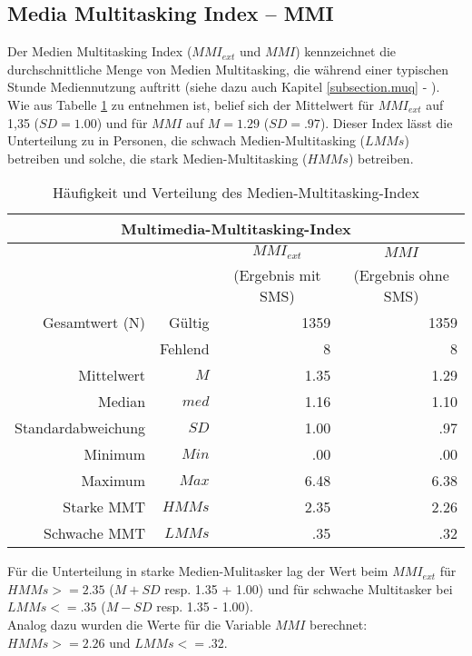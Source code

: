 \subsection{Media Multitasking Index -- MMI}
Der Medien Multitasking Index ($MMI_{ext}$ und $MMI$) kennzeichnet die durchschnittliche Menge von Medien Multitasking, die während einer typischen Stunde Mediennutzung auftritt (siehe dazu auch Kapitel \ref{subsection.muq} - ). Wie aus Tabelle \ref{table.deskrptMedien} zu entnehmen ist, belief sich der Mittelwert für $MMI_{ext}$ auf 1,35 ($SD =  1.00$) und für $MMI$ auf $M = 1.29$ ($SD = .97$). Dieser Index lässt die Unterteilung zu in Personen, die schwach Medien-Multitasking ($LMMs$) betreiben und solche, die stark Medien-Multitasking ($HMMs$) betreiben.\\
\begin{table}[ht] 
    \centering
    \caption{Häufigkeit und Verteilung des Medien-Multitasking-Index}
    \begin{tabular}[t]{|r r|r|r|} 
        \hline
        \multicolumn{4}{|c|}{\textbf{Multimedia-Multitasking-Index}}\\ 
        \hline       
        \multicolumn{2}{|c}{} & \multicolumn{1}{c|}{$MMI_{ext}$} & \multicolumn{1}{|c|}{$MMI$}\\
        \multicolumn{2}{|c}{} & \multicolumn{1}{c|}{(Ergebnis mit SMS)} & \multicolumn{1}{|c|}{(Ergebnis ohne SMS)}\\
        \hline
        Gesamtwert (N) & Gültig & 1359 & 1359\\
        & Fehlend & 8 & 8\\
        Mittelwert & $M$ & 1.35 & 1.29\\
        Median & $med$ & 1.16 & 1.10\\
        Standardabweichung & $SD$ & 1.00 & .97\\
        Minimum & $Min$ & .00 & .00\\
        Maximum & $Max$ & 6.48 & 6.38\\
        Starke MMT & $HMMs$ & 2.35 & 2.26\\
        Schwache MMT & $LMMs$ & .35 & .32\\
        \hline
    \end{tabular}
    \label{table.deskrptMedien}
\end{table}
Für die Unterteilung in starke Medien-Mulitasker lag der Wert beim $MMI_{ext}$ für $HMMs >= 2.35$ ($M + SD$ resp. 1.35 + 1.00) und für schwache Multitasker bei $LMMs <= .35$ ($M - SD$ resp. 1.35 - 1.00). \\
Analog dazu wurden die Werte für die Variable $MMI$ berechnet: $HMMs >= 2.26$ und $LMMs <= .32$. \\

